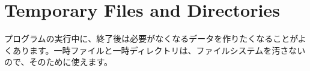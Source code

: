 \section{Temporary Files and Directories}

プログラムの実行中に、終了後は必要がなくなるデータを作りたくなることがよくあります。一時ファイルと一時ディレクトリは、ファイルシステムを汚さないので、そのために使えます。




